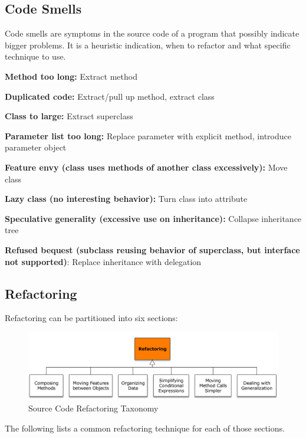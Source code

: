 \subsection{Code Smells}
Code smells are symptoms in the source code of a program that possibly indicate bigger problems. It is a heuristic indication, when to refactor and what specific technique to use.
\begin{description}[]
  \item \textbf{Method too long:} Extract method
  \item \textbf{Duplicated code:} Extract/pull up method, extract class
  \item \textbf{Class to large:} Extract superclass
  \item \textbf{Parameter list too long:} Replace parameter with explicit method, introduce parameter object
  \item \textbf{Feature envy (class uses methods of another class excessively):} Move class
  \item \textbf{Lazy class (no interesting behavior):} Turn class into attribute 
  \item \textbf{Speculative generality (excessive use on inheritance):} Collapse inheritance tree
  \item \textbf{Refused bequest (subclass reusing behavior of superclass, but interface not supported)}: Replace inheritance with delegation
\end{description}
\newpage

\subsection{Refactoring}
Refactoring can be partitioned into six sections:

\begin{figure}[h]
	\centering
	\includegraphics[width=\linewidth]{images/refactoring_taxonomy}
	\caption{Source Code Refactoring Taxonomy}
\end{figure}

The following lists a common refactoring technique for each of those sections.


